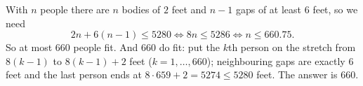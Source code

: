 With $n$ people there are $n$ bodies of $2$ feet and $n-1$ gaps of at least $6$ feet, so we need
\[2n+6(n-1)\le5280\iff8n\le5286\iff n\le660.75.\]
So at most $660$ people fit. And $660$ do fit: put the $k$th person on the stretch from $8(k-1)$ to $8(k-1)+2$ feet ($k=1,\dots,660$); neighbouring gaps are exactly $6$ feet and the last person ends at $8\cdot659+2=5274\le5280$ feet. The answer is $\boxed{660}$.

